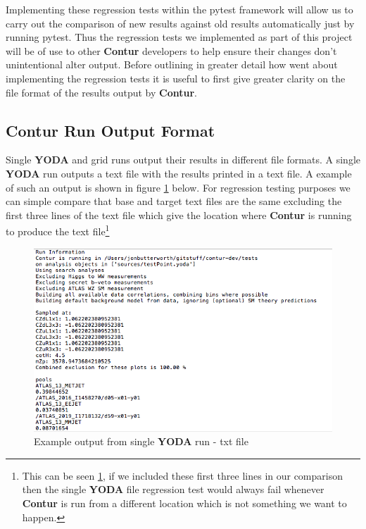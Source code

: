 Implementing these regression tests within the pytest framework will allow us to carry out the comparison of new results against old results automatically just by running pytest. Thus the regression tests we implemented as part of this project will be of use to other \textbf{Contur} developers to help ensure their changes don't unintentional alter output. Before outlining in greater detail how went about implementing the regression tests it is useful to first give greater clarity on the file format of the results output by \textbf{Contur}.

\subsection{Contur Run Output Format}
Single \textbf{YODA} and grid runs output their results in different file formats. A single \textbf{YODA} run outputs a text file with the results printed in a text file. A example of such an output is shown in figure \ref{fig:contur_txt_output} below. For regression testing purposes we can simple compare that base and target text files are the same excluding the first three lines of the text file which give the location where \textbf{Contur} is running to produce the text file\footnote{This can be seen \ref{fig:contur_txt_output}, if we included these first three lines in our comparison then the single \textbf{YODA} file regression test would always fail whenever \textbf{Contur} is run from a different location which is not something we want to happen.}

\begin{figure}[H]
\centering
\includegraphics[scale=0.6]{plots/single_yoda_run.png}
\caption{Example output from single \textbf{YODA} run - txt file}
\label{fig:contur_txt_output}
\end{figure}

